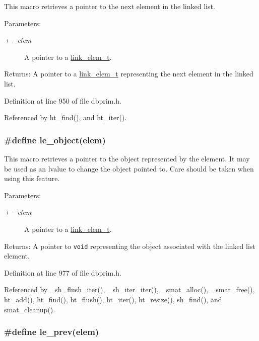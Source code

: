 This macro retrieves a pointer to the next element in the linked list.

\begin{Desc}
\item[Parameters:]
\begin{description}
\item[\mbox{$\leftarrow$} {\em elem}]A pointer to a \hyperlink{group__dbprim__link_ga1}{link\_\-elem\_\-t}.\end{description}
\end{Desc}
\begin{Desc}
\item[Returns:]A pointer to a \hyperlink{group__dbprim__link_ga1}{link\_\-elem\_\-t} representing the next element in the linked list.\end{Desc}


Definition at line 950 of file dbprim.h.

Referenced by ht\_\-find(), and ht\_\-iter().\hypertarget{group__dbprim__link_ga25}{
\subsubsection[le\_\-object]{\setlength{\rightskip}{0pt plus 5cm}\#define le\_\-object(elem)}}
\label{group__dbprim__link_ga25}


This macro retrieves a pointer to the object represented by the element. It may be used as an lvalue to change the object pointed to. Care should be taken when using this feature.

\begin{Desc}
\item[Parameters:]
\begin{description}
\item[\mbox{$\leftarrow$} {\em elem}]A pointer to a \hyperlink{group__dbprim__link_ga1}{link\_\-elem\_\-t}.\end{description}
\end{Desc}
\begin{Desc}
\item[Returns:]A pointer to {\tt void} representing the object associated with the linked list element.\end{Desc}


Definition at line 977 of file dbprim.h.

Referenced by \_\-sh\_\-flush\_\-iter(), \_\-sh\_\-iter\_\-iter(), \_\-smat\_\-alloc(), \_\-smat\_\-free(), ht\_\-add(), ht\_\-find(), ht\_\-flush(), ht\_\-iter(), ht\_\-resize(), sh\_\-find(), and smat\_\-cleanup().\hypertarget{group__dbprim__link_ga24}{
\subsubsection[le\_\-prev]{\setlength{\rightskip}{0pt plus 5cm}\#define le\_\-prev(elem)}}
\label{group__dbprim__link_ga24}


